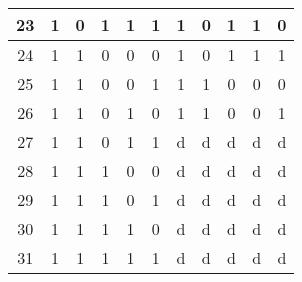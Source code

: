 \documentclass{article}
\begin{document}
\begin{center}
\begin{tabular}{|c|ccccc|ccccc|}
    23 & 1 & 0 & 1 & 1 & 1 & 1 & 0 & 1 & 1 & 0 \\ \hline
    24 & 1 & 1 & 0 & 0 & 0 & 1 & 0 & 1 & 1 & 1 \\ \hline
    25 & 1 & 1 & 0 & 0 & 1 & 1 & 1 & 0 & 0 & 0 \\ \hline
    26 & 1 & 1 & 0 & 1 & 0 & 1 & 1 & 0 & 0 & 1 \\ \hline
    27 & 1 & 1 & 0 & 1 & 1 & d & d & d & d & d \\ \hline
    28 & 1 & 1 & 1 & 0 & 0 & d & d & d & d & d \\ \hline
    29 & 1 & 1 & 1 & 0 & 1 & d & d & d & d & d \\ \hline
    30 & 1 & 1 & 1 & 1 & 0 & d & d & d & d & d \\ \hline
    31 & 1 & 1 & 1 & 1 & 1 & d & d & d & d & d \\ \hline
\end{tabular}\end{center}
\end{document}
